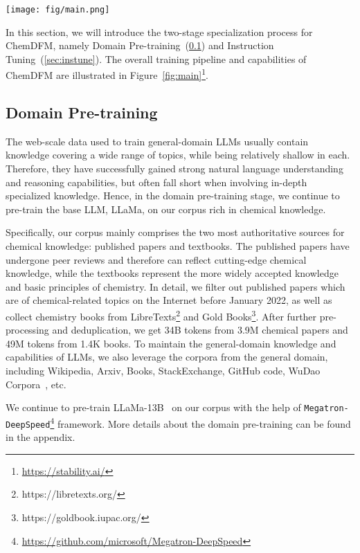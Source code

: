 \begin{figure*}
    \centering
    \texttt{[image: fig/main.png]}
    \vspace{-3mm}
    \caption{The training pipeline and supporting tasks of ChemDFM. The icons are generated by the SDXL model provided by Stability AI.}
    \label{fig:main}
    \vspace{-3mm}
\end{figure*}

In this section, we will introduce the two-stage specialization process for ChemDFM, namely Domain Pre-training~(\cref{sec:pretrain}) and Instruction Tuning~(\cref{sec:instune}).
The overall training pipeline and capabilities of ChemDFM are illustrated in Figure~\ref{fig:main}\footnote{\url{https://stability.ai/}}.

\subsection{Domain Pre-training}\label{sec:pretrain}

The web-scale data used to train general-domain LLMs usually contain knowledge covering a wide range of topics, while being relatively shallow in each. Therefore, they have successfully gained strong natural language understanding and reasoning capabilities, but often fall short when involving in-depth specialized knowledge. Hence, in the domain pre-training stage, we continue to pre-train the base LLM, LLaMa, on our corpus rich in chemical knowledge.

Specifically, our corpus mainly comprises the two most authoritative sources for chemical knowledge: published papers and textbooks. The published papers have undergone peer reviews and therefore can reflect
cutting-edge chemical knowledge, while the textbooks represent the more widely accepted knowledge and basic principles of chemistry. In detail, we filter out published papers which are of chemical-related topics on the Internet before January 2022, as well as collect chemistry books from LibreTexts\footnote{https://libretexts.org/} and Gold Books\footnote{https://goldbook.iupac.org/}. After further pre-processing and deduplication, we get 34B tokens from 3.9M chemical papers and 49M tokens from 1.4K books. To maintain the general-domain knowledge and capabilities of LLMs, we also leverage the corpora from the general domain, including Wikipedia, Arxiv, Books, StackExchange, GitHub code, WuDao Corpora~\cite{yuan2021wudaocorpora}, etc.

We continue to pre-train LLaMa-13B~\cite{touvron2023llama} on our corpus with the help of {\tt Megatron-DeepSpeed}\footnote{\url{https://github.com/microsoft/Megatron-DeepSpeed}} framework. More details about the domain pre-training can be found in the appendix.

